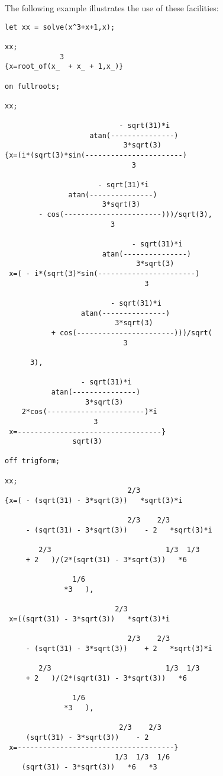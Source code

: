 The following example illustrates the use of these facilities:
\begin{verbatim}
let xx = solve(x^3+x+1,x);

xx;
             3
{x=root_of(x_  + x_ + 1,x_)}

on fullroots;

xx;

                           - sqrt(31)*i
                    atan(---------------)
                            3*sqrt(3)
{x=(i*(sqrt(3)*sin(-----------------------)
                              3

                      - sqrt(31)*i
               atan(---------------)
                       3*sqrt(3)
        - cos(-----------------------)))/sqrt(3),
                         3

                              - sqrt(31)*i
                       atan(---------------)
                               3*sqrt(3)
 x=( - i*(sqrt(3)*sin(-----------------------)
                                 3

                         - sqrt(31)*i
                  atan(---------------)
                          3*sqrt(3)
           + cos(-----------------------)))/sqrt(
                            3

      3),

                  - sqrt(31)*i
           atan(---------------)
                   3*sqrt(3)
    2*cos(-----------------------)*i
                     3
 x=----------------------------------}
                sqrt(3)

off trigform;

xx;
                             2/3
{x=( - (sqrt(31) - 3*sqrt(3))   *sqrt(3)*i

                             2/3    2/3
     - (sqrt(31) - 3*sqrt(3))    - 2   *sqrt(3)*i

        2/3                           1/3  1/3
     + 2   )/(2*(sqrt(31) - 3*sqrt(3))   *6

                1/6
              *3   ),

                          2/3
 x=((sqrt(31) - 3*sqrt(3))   *sqrt(3)*i

                             2/3    2/3
     - (sqrt(31) - 3*sqrt(3))    + 2   *sqrt(3)*i

        2/3                           1/3  1/3
     + 2   )/(2*(sqrt(31) - 3*sqrt(3))   *6

                1/6
              *3   ),

                           2/3    2/3
     (sqrt(31) - 3*sqrt(3))    - 2
 x=-------------------------------------}
                          1/3  1/3  1/6
    (sqrt(31) - 3*sqrt(3))   *6   *3
\end{verbatim}

